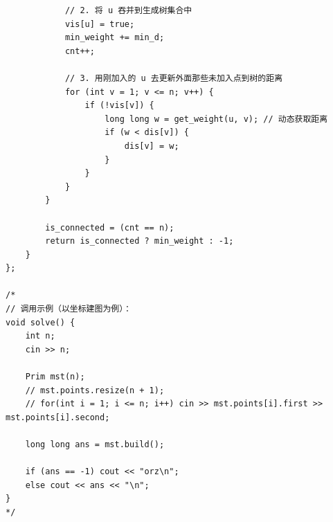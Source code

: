 \documentclass[10pt, a4paper, twocolumn]{article} %
\begin{document}
\begin{lstlisting}
            // 2. 将 u 吞并到生成树集合中
            vis[u] = true;
            min_weight += min_d;
            cnt++;

            // 3. 用刚加入的 u 去更新外面那些未加入点到树的距离
            for (int v = 1; v <= n; v++) {
                if (!vis[v]) {
                    long long w = get_weight(u, v); // 动态获取距离
                    if (w < dis[v]) {
                        dis[v] = w;
                    }
                }
            }
        }

        is_connected = (cnt == n);
        return is_connected ? min_weight : -1;
    }
};

/*
// 调用示例（以坐标建图为例）：
void solve() {
    int n; 
    cin >> n;
    
    Prim mst(n);
    // mst.points.resize(n + 1);
    // for(int i = 1; i <= n; i++) cin >> mst.points[i].first >> mst.points[i].second;
    
    long long ans = mst.build();
    
    if (ans == -1) cout << "orz\n";
    else cout << ans << "\n";
}
*/   
    \end{lstlisting}
\end{document}
